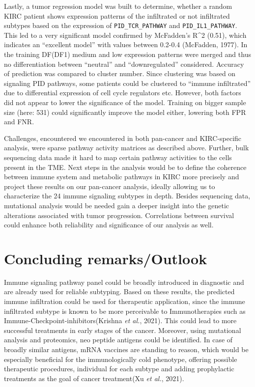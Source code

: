 \documentclass[
  parskip,
  oneside]{scrreprt}
\begin{document}
Lastly, a tumor regression model was built to determine, whether a
random KIRC patient shows expression patterns of the infiltrated or not
infiltrated subtypes based on the expression of
\texttt{PID\_TCR\_PATHWAY} and \texttt{PID\_IL1\_PATHWAY}. This led to a
very significant model confirmed by McFadden's R\^{}2 (0.51), which
indicates an ``excellent model'' with values between 0.2-0.4 (McFadden,
1977). In the training DF(DF1) medium and low expression patterns were
merged and thus no differentiation between ``neutral'' and
``downregulated'' considered. Accuracy of prediction was compared to
cluster number. Since clustering was based on signaling PID pathways,
some patients could be clustered to ``immune infiltrated'' due to
differential expression of cell cycle regulators etc. However, both
factors did not appear to lower the significance of the model. Training
on bigger sample size (here: 531) could significantly improve the model
either, lowering both FPR and FNR.

Challenges, encountered we encountered in both pan-cancer and
KIRC-specific analysis, were sparse pathway activity matrices as
described above. Further, bulk sequencing data made it hard to map
certain pathway activities to the cells present in the TME. Next steps
in the analysis would be to define the coherence between immune system
and metabolic pathways in KIRC more precisely and project these results
on our pan-cancer analysis, ideally allowing us to characterize the 24
immune signaling subtypes in depth. Besides sequencing data, mutational
analysis would be needed gain a deeper insight into the genetic
alterations associated with tumor progression. Correlations between
survival could enhance both reliability and significance of our analysis
as well.

\hypertarget{concluding-remarksoutlook}{%
\chapter{Concluding remarks/Outlook}\label{concluding-remarksoutlook}}

Immune signaling pathway panel could be broadly introduced in diagnostic
and are already used for reliable subtyping. Based on these results, the
predicted immune infiltration could be used for therapeutic application,
since the immune infiltrated subtype is known to be more perceivable to
Immunotherapies such as Immune-Checkpoint-inhibitors(Krishna \emph{et
al.}, 2021). This could lead to more successful treatments in early
stages of the cancer. Moreover, using mutational analysis and
proteomics, neo peptide antigens could be identified. In case of broadly
similar antigens, mRNA vaccines are standing to reason, which would be
especially beneficial for the immunologically cold phenotype, offering
possible therapeutic procedures, individual for each subtype and adding
prophylactic treatments as the goal of cancer treatment(Xu \emph{et
al.}, 2021).
\end{document}
